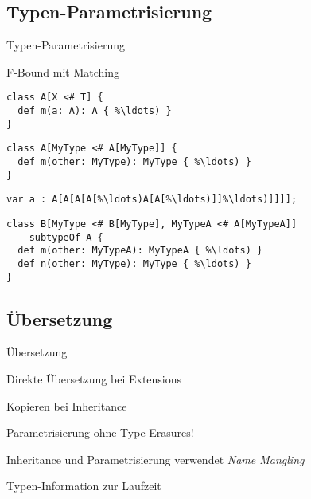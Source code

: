 \subsection{Typen-Parametrisierung}
\begin{frame}{Typen-Parametrisierung}
	\begin{bigitemize}{3mm}
		\item F-Bound mit Matching
	\end{bigitemize}
\end{frame}

\begin{frame}[c,fragile]
\begin{lstlisting}[language=ooplss]
class A[X <# T] {
  def m(a: A): A { %\ldots) }
}
\end{lstlisting}
\pause
\begin{lstlisting}[language=ooplss]
class A[MyType <# A[MyType]] {
  def m(other: MyType): MyType { %\ldots) }
}
\end{lstlisting}
\pause
\begin{lstlisting}[language=ooplss]
var a : A[A[A[A[%\ldots)A[A[%\ldots)]]%\ldots)]]]];
\end{lstlisting}
\pause
\begin{lstlisting}[language=ooplss]
class B[MyType <# B[MyType], MyTypeA <# A[MyTypeA]]
    subtypeOf A {
  def m(other: MyTypeA): MyTypeA { %\ldots) }
  def n(other: MyType): MyType { %\ldots) }
}
\end{lstlisting}
\end{frame}

\subsection{Übersetzung}
\begin{frame}{Übersetzung}
	\begin{bigitemize}{3mm}
		\item Direkte Übersetzung bei Extensions
		\item Kopieren bei Inheritance
		\item Parametrisierung ohne Type Erasures!
		\item Inheritance und Parametrisierung verwendet \emph{Name Mangling}
		\item Typen-Information zur Laufzeit
	\end{bigitemize}
\end{frame}
%
